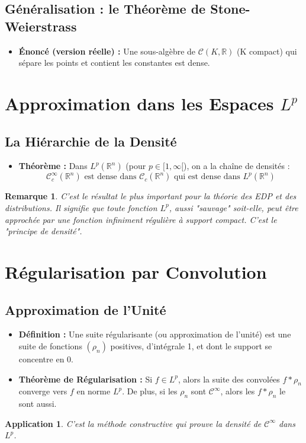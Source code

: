 \documentclass[12pt, a4paper, parskip=full]{report}
\theoremstyle{agregstyle}
\newtheorem{remark}[definition]{Remarque}
\newtheorem{application}[definition]{Application}
\begin{document}
\subsection{Généralisation : le Théorème de Stone-Weierstrass}
\begin{itemize}
    \item \textbf{Énoncé (version réelle) :} Une sous-algèbre de $\mathcal{C}(K, \mathbb{R})$ (K compact) qui sépare les points et contient les constantes est dense.
\end{itemize}

\section{Approximation dans les Espaces $L^p$}
\subsection{La Hiérarchie de la Densité}
\begin{itemize}
    \item \textbf{Théorème :} Dans $L^p(\mathbb{R}^n)$ (pour $p \in [1, \infty[$), on a la chaîne de densités :
    $$ \mathcal{C}_c^\infty(\mathbb{R}^n) \text{ est dense dans } \mathcal{C}_c(\mathbb{R}^n) \text{ qui est dense dans } L^p(\mathbb{R}^n) $$
\end{itemize}
\begin{remark}
    C'est le résultat le plus important pour la théorie des EDP et des distributions. Il signifie que toute fonction $L^p$, aussi "sauvage" soit-elle, peut être approchée par une fonction infiniment régulière à support compact. C'est le "principe de densité".
\end{remark}

\section{Régularisation par Convolution}
\subsection{Approximation de l'Unité}
\begin{itemize}
    \item \textbf{Définition :} Une suite régularisante (ou approximation de l'unité) est une suite de fonctions $(\rho_n)$ positives, d'intégrale 1, et dont le support se concentre en 0.
    \item \textbf{Théorème de Régularisation :} Si $f \in L^p$, alors la suite des convolées $f*\rho_n$ converge vers $f$ en norme $L^p$. De plus, si les $\rho_n$ sont $\mathcal{C}^\infty$, alors les $f*\rho_n$ le sont aussi.
\end{itemize}
\begin{application}
    C'est la méthode constructive qui prouve la densité de $\mathcal{C}^\infty$ dans $L^p$.
\end{application}
\end{document}
